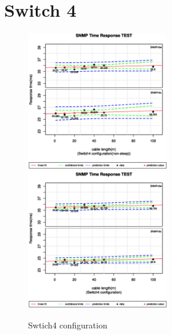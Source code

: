 \documentclass[11pt
  , a4paper
  , article
  , oneside
]{memoir}
\begin{document}
\section{Switch 4}
 \begin{figure}[!htb]
  \centering
  \includegraphics[width=0.55\textwidth]{./images/s4sx.eps}
  \includegraphics[width=0.55\textwidth]{./images/s4s1.eps}
  \caption{Swtich4 configuration}
\end{figure}
\clearpage
\end{document}
